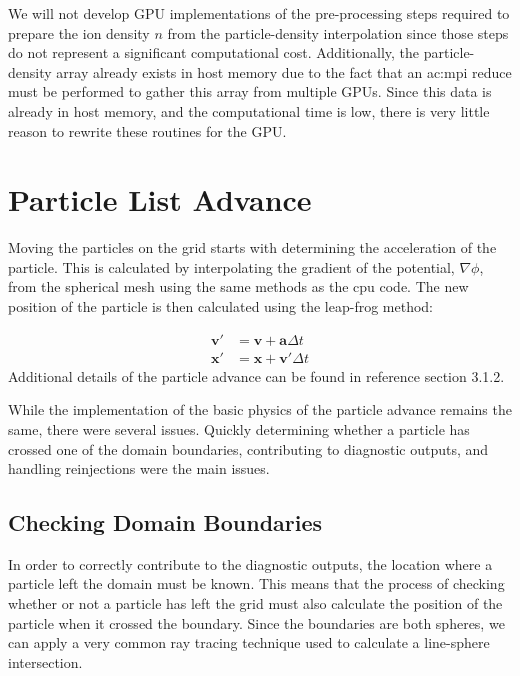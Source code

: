 We will not develop GPU implementations of the pre-processing steps required to prepare the ion density $n$ from the particle-density interpolation since those steps do not represent a significant computational cost. Additionally, the particle-density array already exists in host memory due to the fact that an \gls{ac:mpi} reduce must be performed to gather this array from multiple GPUs. Since this data is already in host memory, and the computational time is low, there is very little reason to rewrite these routines for the GPU.  


 
	\section{Particle List Advance}
	
Moving the particles on the grid starts with determining the acceleration of the particle. This is calculated by interpolating the gradient of the potential, $\nabla\phi$, from the spherical mesh using the same methods as the cpu code. The new position of the particle is then calculated using the leap-frog method:

\begin{equation}
\begin{aligned}
\mathbf{v}' &= \mathbf{v}+\mathbf{a}\Delta t \\
\mathbf{x}' &= \mathbf{x}+\mathbf{v}'\Delta t
\end{aligned}
\end{equation}
 Additional details of the particle advance can be found in reference \cite{Patacchini2007} section 3.1.2.
		
While the implementation of the basic physics of the particle advance remains the same, there were several issues. Quickly determining whether a particle has crossed one of the domain boundaries, contributing to diagnostic outputs, and handling reinjections were the main issues. 

		\subsection{Checking Domain Boundaries}
In order to correctly contribute to the diagnostic outputs, the location where a particle left the domain must be known. This means that the process of checking whether or not a particle has left the grid must also calculate the position of the particle when it crossed the boundary. Since the boundaries are both spheres, we can apply a very common ray tracing technique used to calculate a line-sphere intersection. 

